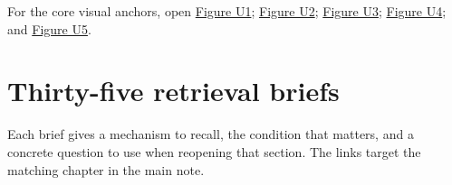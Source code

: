 For the core visual anchors, open \href{Continuous\%20Notes/University\%20-\%20Worlds,\%20Images\%20and\%20Inference\%20-\%20Graphics,\%20Vision\%20and\%20Photography\#Figure\%20U1\%20-\%20Linear\%20maps\%20separate\%20directions\%20stretches\%20and\%20output\%20placement}{Figure U1}; \href{Continuous\%20Notes/University\%20-\%20Worlds,\%20Images\%20and\%20Inference\%20-\%20Graphics,\%20Vision\%20and\%20Photography\#Figure\%20U2\%20-\%20A\%20half-edge\%20separates\%20face\%20traversal\%20from\%20edge\%20traversal}{Figure U2}; \href{Continuous\%20Notes/University\%20-\%20Worlds,\%20Images\%20and\%20Inference\%20-\%20Graphics,\%20Vision\%20and\%20Photography\#Figure\%20U3\%20-\%20Two\%20signals\%20can\%20share\%20the\%20same\%20samples}{Figure U3}; \href{Continuous\%20Notes/University\%20-\%20Worlds,\%20Images\%20and\%20Inference\%20-\%20Graphics,\%20Vision\%20and\%20Photography\#Figure\%20U4\%20-\%20Lighting\%20rank\%20determines\%20which\%20normal\%20components\%20can\%20be\%20measured}{Figure U4}; and \href{Continuous\%20Notes/University\%20-\%20Worlds,\%20Images\%20and\%20Inference\%20-\%20Graphics,\%20Vision\%20and\%20Photography\#Figure\%20U5\%20-\%20A\%20direct-light\%20renderer\%20makes\%20the\%20pipeline\%20executable}{Figure U5}.

\section{Thirty-five retrieval briefs}\label{appendix-a8f634b076b5-thirty-five-retrieval-briefs}

Each brief gives a mechanism to recall, the condition that matters, and a concrete question to use when reopening that section. The links target the matching chapter in the main note.

